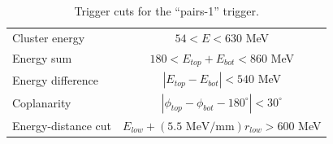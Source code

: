 \begin{table}[ht]
    \begin{center}
        \caption{Trigger cuts for the ``pairs-1'' trigger.}
        \begin{tabular}{lc}   
            \hline \hline
            Cluster energy & $54<E<630$ MeV \\
            Energy sum & $180<E_{top}+E_{bot}<860$ MeV \\
            Energy difference & $|E_{top}-E_{bot}|<540$ MeV \\
            Coplanarity & $|\phi_{top}-\phi_{bot}-180^\circ|<30^\circ$ \\
            Energy-distance cut & $E_{low}+(5.5\text{ MeV/mm})r_{low}>600$ MeV \\
            \hline \hline
        \end{tabular}
        \label{tab:trigger_cuts} 
    \end{center}
\end{table}

